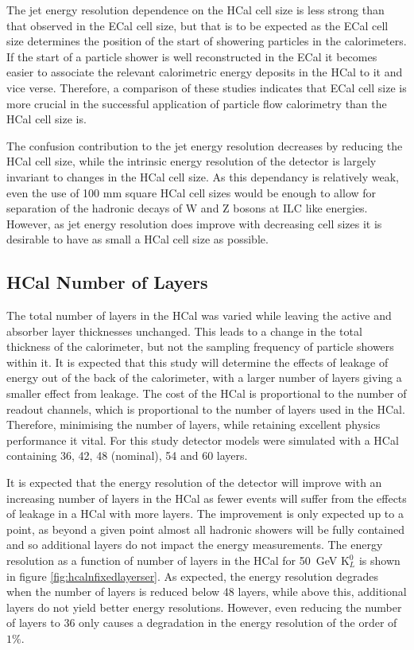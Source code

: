 The jet energy resolution dependence on the HCal cell size is less strong than that observed in the ECal cell size, but that is to be expected as the ECal cell size determines the position of the start of showering particles in the calorimeters.  If the start of a particle shower is well reconstructed in the ECal it becomes easier to associate the relevant calorimetric energy deposits in the HCal to it and vice verse.  Therefore, a comparison of these studies indicates that ECal cell size is more crucial in the successful application of particle flow calorimetry than the HCal cell size is.

The confusion contribution to the jet energy resolution decreases by reducing the HCal cell size, while the intrinsic energy resolution of the detector is largely invariant to changes in the HCal cell size.  As this dependancy is relatively weak, even the use of 100 mm square HCal cell sizes would be enough to allow for separation of the hadronic decays of W and Z bosons at ILC like energies.  However, as jet energy resolution does improve with decreasing cell sizes it is desirable to have as small a HCal cell size as possible.


\subsection{HCal Number of Layers}
\label{sec:hcalnlayers}
The total number of layers in the HCal was varied while leaving the active and absorber layer thicknesses unchanged.  This leads to a change in the total thickness of the calorimeter, but not the sampling frequency of particle showers within it.  It is expected that this study will determine the effects of leakage of energy out of the back of the calorimeter, with a larger number of layers giving a smaller effect from leakage.  The cost of the HCal is proportional to the number of readout channels, which is proportional to the number of layers used in the HCal.  Therefore, minimising the number of layers, while retaining excellent physics performance it vital.  For this study detector models were simulated with a HCal containing 36, 42, 48 (nominal), 54 and 60 layers. 

It is expected that the energy resolution of the detector will improve with an increasing number of layers in the HCal as fewer events will suffer from the effects of leakage in a HCal with more layers.  The improvement is only expected up to a point, as beyond a given point almost all hadronic showers will be fully contained and so additional layers do not impact the energy measurements.  The energy resolution as a function of number of layers in the HCal for 50~GeV $\text{K}^{0}_{L}$ is shown in figure \ref{fig:hcalnfixedlayerser}.  As expected, the energy resolution degrades when the number of layers is reduced below 48 layers, while above this, additional layers do not yield better energy resolutions.  However, even reducing the number of layers to 36 only causes a degradation in the energy resolution of the order of $1\%$.  

